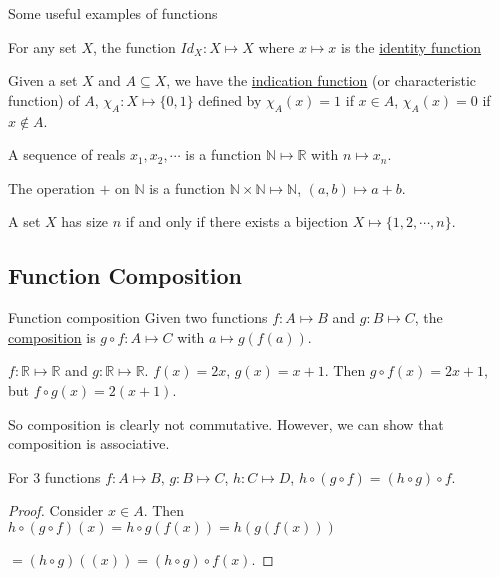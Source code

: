 \documentclass[../Main.tex]{subfiles}
\begin{document}
\begin{examples}{Some useful examples of functions}
    \item For any set $X$, the function $Id_X : X \mapsto X$ where $x \mapsto x$ is the \underline{identity function}
    \item Given a set $X$ and $A \subseteq X$, we have the \underline{indication function} (or characteristic function) of $A$, $\chi_A : X \mapsto \{0, 1\}$ defined by $\chi_A(x) = 1$ if $x \in A$, $\chi_A(x) = 0$ if $x \notin A$.
    \item A sequence of reals $x_1, x_2, \cdots$  is a function $\mathbb{N} \mapsto \mathbb{R}$ with $n \mapsto x_n$.
    \item The operation $+$ on $\mathbb{N}$ is a function $\mathbb{N} \times \mathbb{N} \mapsto \mathbb{N}$, $(a, b) \mapsto a + b$.
    \item A set $X$ has size $n$ if and only if there exists a bijection $X \mapsto \{1, 2, \cdots, n\}$.
\end{examples}
\subsection{Function Composition}
\begin{definition}{Function composition}
Given two functions $f : A \mapsto B$ and $g : B \mapsto C$, the \underline{composition} is $g \circ f : A \mapsto C$ with $a \mapsto g(f(a))$.
\end{definition}
\begin{example}
    $f : \mathbb{R} \mapsto \mathbb{R}$ and $g : \mathbb{R} \mapsto \mathbb{R}$.
    $f(x) = 2x$, $g(x) = x + 1$.
    Then $g \circ f(x) = 2x + 1$, but $f \circ g(x) = 2(x+1)$.
\end{example}
So composition is clearly not commutative. However, we can show that composition is associative.
\begin{proposition}
    For 3 functions $f : A \mapsto B$, $g : B \mapsto C$, $h : C \mapsto D$, $h \circ (g \circ f) = (h \circ g) \circ f$.
\end{proposition}
\begin{proof}
    Consider $x \in A$. Then $h \circ (g \circ f)(x) = h \circ g(f(x)) = h(g(f(x)))$\par
    $=(h \circ g)((x)) = (h \circ g) \circ f(x)$.
\end{proof}
\end{document}
